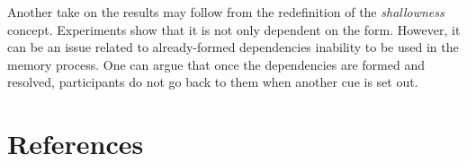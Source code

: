 \documentclass[doc]{apa6}
\begin{document}
Another take on the results may follow from the redefinition of the \emph{shallowness} concept. Experiments show that it is not only dependent on the form. However, it can be an issue related to already-formed dependencies inability to be used in the memory process. One can argue that once the dependencies are formed and resolved, participants do not go back to them when another cue is set out.

\hypertarget{references}{%
\section{References}\label{references}}

\begingroup
\setlength{\parindent}{-0.5in}
\setlength{\leftskip}{0.5in}

\hypertarget{refs}{}

\endgroup

\printbibliography
\end{document}
